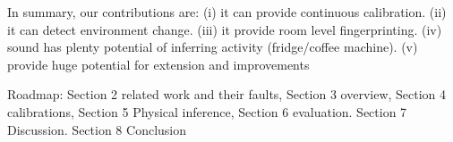 In summary, our contributions are: (i) it can provide continuous calibration. (ii) it can detect environment change. 
(iii) it provide room level fingerprinting. (iv) sound has plenty potential of inferring activity (fridge/coffee machine).
(v) provide huge potential for extension and improvements

Roadmap: Section 2 related work and their faults, Section 3 overview, Section 4 calibrations, Section 5 Physical inference, 
Section 6 evaluation. Section 7 Discussion. Section 8 Conclusion






